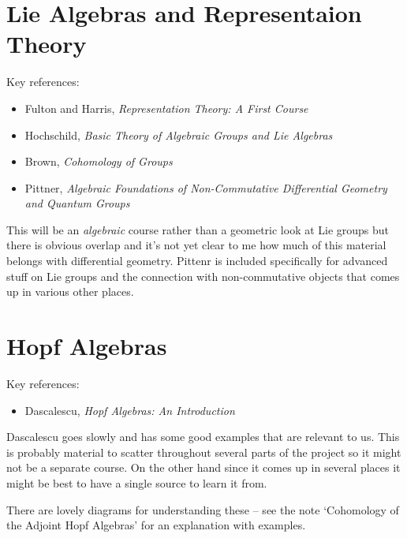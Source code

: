 \documentclass[article]{article}
\begin{document}
\section{Lie Algebras and Representaion Theory}

Key references:
\begin{itemize}
	\item{Fulton and Harris, \textit{Representation Theory: A First Course}}
	\item{Hochschild, \textit{Basic Theory of Algebraic Groups and Lie Algebras}}
	\item{Brown, \textit{Cohomology of Groups}}
	\item{Pittner, \textit{Algebraic Foundations of Non-Commutative Differential Geometry and Quantum Groups}}
\end{itemize}

This will be an \textit{algebraic} course rather than a geometric look at Lie groups but there is obvious overlap and it's not yet clear to me how much of this material belongs with differential geometry. Pittenr is included specifically for advanced stuff on Lie groups and the connection with non-commutative objects that comes up in various other places.

\section{Hopf Algebras}

Key references:
\begin{itemize}
	\item{Dascalescu, \textit{Hopf Algebras: An Introduction}}
\end{itemize}

Dascalescu goes slowly and has some good examples that are relevant to us. This is probably material to scatter throughout several parts of the project so it might not be a separate course. On the other hand since it comes up in several places it might be best to have a single source to learn it from.

There are lovely diagrams for understanding these -- see the note `Cohomology of the Adjoint Hopf Algebras' for an explanation with examples.
\end{document}
